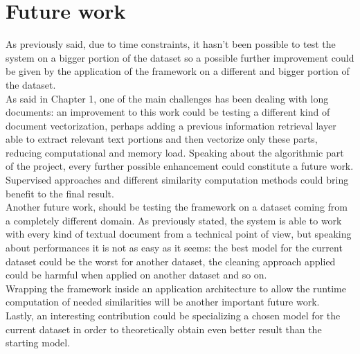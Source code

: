 \documentclass[\main/main.tex]{subfiles}
\begin{document}
\section{Future work}
As previously said, due to time constraints, it hasn't been possible to test the system on a bigger portion of the dataset so a possible further improvement could be given by the application of the framework on a different and bigger portion of the dataset. \\
As said in Chapter 1, one of the main challenges has been dealing with long documents: an improvement to this work could be testing a different kind of document vectorization, perhaps adding a previous information retrieval layer able to extract relevant text portions and then vectorize only these parts, reducing computational and memory load. Speaking about the algorithmic part of the project, every further possible enhancement could constitute a future work. Supervised approaches and different similarity computation methods could bring benefit to the final result.\\
Another future work, should be testing the framework on a dataset coming from a completely different domain. As previously stated, the system is able to work with every kind of textual document from a technical point of view, but speaking about performances it is not as easy as it seems: the best model for the current dataset could be the worst for another dataset, the cleaning approach applied could be harmful when applied on another dataset and so on.\\
Wrapping the framework inside an application architecture to allow the runtime computation of needed similarities will be another important future work. \\
Lastly, an interesting contribution could be specializing a chosen model for the current dataset in order to theoretically obtain even better result than the starting model.
\end{document}
